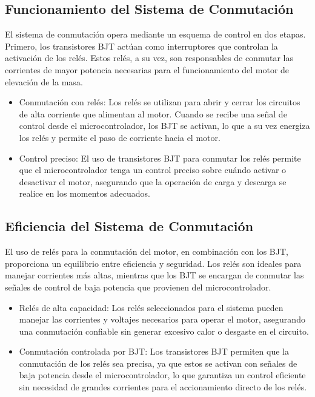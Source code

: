             \subsection{Funcionamiento del Sistema de Conmutación}
                El sistema de conmutación opera mediante un esquema de control en dos etapas. Primero, los transistores BJT actúan como interruptores que controlan la activación de los relés. Estos relés, a su vez, son responsables de conmutar las corrientes de mayor potencia necesarias para el funcionamiento del motor de elevación de la masa.\par
                \begin{itemize} [label=•]
                    \setlength{\itemindent}{1.5em}
                    
                    \item Conmutación con relés: Los relés se utilizan para abrir y cerrar los circuitos de alta corriente que alimentan al motor. Cuando se recibe una señal de control desde el microcontrolador, los BJT se activan, lo que a su vez energiza los relés y permite el paso de corriente hacia el motor.
                    \item Control preciso: El uso de transistores BJT para conmutar los relés permite que el microcontrolador tenga un control preciso sobre cuándo activar o desactivar el motor, asegurando que la operación de carga y descarga se realice en los momentos adecuados.
                \end{itemize}
                
            \subsection{Eficiencia del Sistema de Conmutación}
                El uso de relés para la conmutación del motor, en combinación con los BJT, proporciona un equilibrio entre eficiencia y seguridad. Los relés son ideales para manejar corrientes más altas, mientras que los BJT se encargan de conmutar las señales de control de baja potencia que provienen del microcontrolador.

                \begin{itemize} [label=•]
                    \setlength{\itemindent}{1.5em}
                    
                    \item Relés de alta capacidad: Los relés seleccionados para el sistema pueden manejar las corrientes y voltajes necesarios para operar el motor, asegurando una conmutación confiable sin generar excesivo calor o desgaste en el circuito.
                    \item Conmutación controlada por BJT: Los transistores BJT permiten que la conmutación de los relés sea precisa, ya que estos se activan con señales de baja potencia desde el microcontrolador, lo que garantiza un control eficiente sin necesidad de grandes corrientes para el accionamiento directo de los relés.
                \end{itemize}
                
